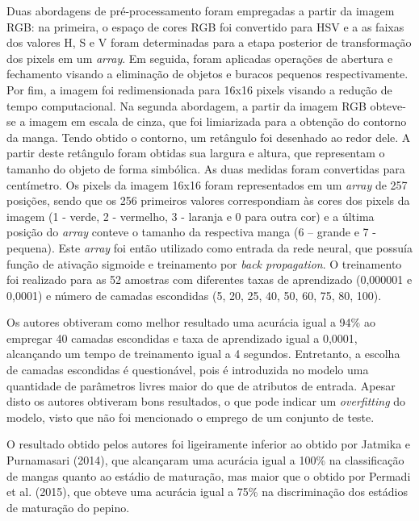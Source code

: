 Duas abordagens de pré-processamento foram empregadas a partir da imagem RGB: na primeira, o espaço de cores RGB foi convertido para HSV e a as faixas dos valores H, S e V foram determinadas para a etapa posterior de transformação dos pixels em um \textit{array}. Em seguida, foram aplicadas operações de abertura e fechamento visando a eliminação de objetos e buracos pequenos respectivamente. Por fim, a imagem foi redimensionada para 16x16 pixels visando a redução de tempo computacional. Na segunda abordagem, a partir da imagem RGB obteve-se a imagem em escala de cinza, que foi limiarizada para a obtenção do contorno da manga. Tendo obtido o contorno, um retângulo foi desenhado ao redor dele. A partir deste retângulo foram obtidas sua largura e altura, que representam o tamanho do objeto de forma simbólica. As duas medidas foram convertidas para centímetro. Os pixels da imagem 16x16 foram representados em um \textit{array} de 257 posições, sendo que os 256 primeiros valores correspondiam às cores dos pixels da imagem (1 - verde, 2 - vermelho, 3 - laranja e 0 para outra cor) e a última posição do \textit{array} conteve o tamanho da respectiva manga (6 – grande e 7 - pequena). Este \textit{array} foi então utilizado como entrada da rede neural, que possuía função de ativação sigmoide e treinamento por \textit{back propagation}. O treinamento foi realizado para as 52 amostras com diferentes taxas de aprendizado (0,000001 e 0,0001) e número de camadas escondidas (5, 20, 25, 40, 50, 60, 75, 80, 100). 

Os autores obtiveram como melhor resultado uma acurácia igual a 94\% ao empregar 40 camadas escondidas e taxa de aprendizado igual a 0,0001, alcançando um tempo de treinamento igual a 4 segundos. Entretanto, a escolha de camadas escondidas é questionável, pois é introduzida no modelo uma quantidade de parâmetros livres maior do que de atributos de entrada. Apesar disto os autores obtiveram bons resultados, o que pode indicar um \textit{overfitting} do modelo, visto que não foi mencionado o emprego de um conjunto de teste. 

O resultado obtido pelos autores foi ligeiramente inferior ao obtido por Jatmika e Purnamasari (2014), que alcançaram uma acurácia igual a 100\% na classificação de mangas quanto ao estádio de maturação, mas maior que o obtido por Permadi et al. (2015), que obteve uma acurácia igual a 75\% na discriminação dos estádios de maturação do pepino.

